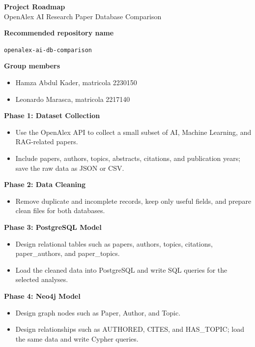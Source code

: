 \documentclass[10pt]{article}
\begin{document}
\begin{center}
    {\Large \textbf{Project Roadmap}}\\
    \vspace{0.2em}
    {\large OpenAlex AI Research Paper Database Comparison}
\end{center}

\textbf{Recommended repository name}

\texttt{openalex-ai-db-comparison}

\textbf{Group members}
\begin{itemize}
    \item Hamza Abdul Kader, matricola 2230150
    \item Leonardo Marasca, matricola 2217140
\end{itemize}

\textbf{Phase 1: Dataset Collection}
\begin{itemize}
    \item Use the OpenAlex API to collect a small subset of AI, Machine Learning, and RAG-related papers.
    \item Include papers, authors, topics, abstracts, citations, and publication years; save the raw data as JSON or CSV.
\end{itemize}

\textbf{Phase 2: Data Cleaning}
\begin{itemize}
    \item Remove duplicate and incomplete records, keep only useful fields, and prepare clean files for both databases.
\end{itemize}

\textbf{Phase 3: PostgreSQL Model}
\begin{itemize}
    \item Design relational tables such as papers, authors, topics, citations, paper\_authors, and paper\_topics.
    \item Load the cleaned data into PostgreSQL and write SQL queries for the selected analyses.
\end{itemize}

\textbf{Phase 4: Neo4j Model}
\begin{itemize}
    \item Design graph nodes such as Paper, Author, and Topic.
    \item Design relationships such as AUTHORED, CITES, and HAS\_TOPIC; load the same data and write Cypher queries.
\end{itemize}
\end{document}
